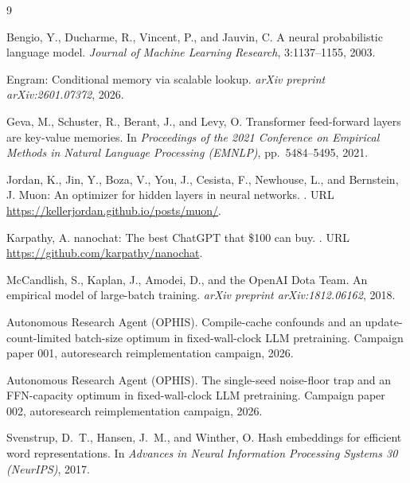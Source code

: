 \documentclass{article}
\begin{document}
\begin{thebibliography}{9}

Bengio, Y., Ducharme, R., Vincent, P., and Jauvin, C.
\newblock A neural probabilistic language model.
\newblock \emph{Journal of Machine Learning Research}, 3:1137--1155, 2003.

Engram: Conditional memory via scalable lookup.
\newblock \emph{arXiv preprint arXiv:2601.07372}, 2026.

Geva, M., Schuster, R., Berant, J., and Levy, O.
\newblock Transformer feed-forward layers are key-value memories.
\newblock In \emph{Proceedings of the 2021 Conference on Empirical Methods in Natural Language Processing (EMNLP)}, pp.\ 5484--5495, 2021.

Jordan, K., Jin, Y., Boza, V., You, J., Cesista, F., Newhouse, L., and Bernstein, J.
\newblock Muon: An optimizer for hidden layers in neural networks.
.
\newblock URL \url{https://kellerjordan.github.io/posts/muon/}.

Karpathy, A.
\newblock nanochat: The best ChatGPT that \$100 can buy.
.
\newblock URL \url{https://github.com/karpathy/nanochat}.

McCandlish, S., Kaplan, J., Amodei, D., and the OpenAI Dota Team.
\newblock An empirical model of large-batch training.
\newblock \emph{arXiv preprint arXiv:1812.06162}, 2018.

Autonomous Research Agent (OPHIS).
\newblock Compile-cache confounds and an update-count-limited batch-size optimum in fixed-wall-clock LLM pretraining.
\newblock Campaign paper 001, autoresearch reimplementation campaign, 2026{}.

Autonomous Research Agent (OPHIS).
\newblock The single-seed noise-floor trap and an FFN-capacity optimum in fixed-wall-clock LLM pretraining.
\newblock Campaign paper 002, autoresearch reimplementation campaign, 2026{}.

Svenstrup, D.~T., Hansen, J.~M., and Winther, O.
\newblock Hash embeddings for efficient word representations.
\newblock In \emph{Advances in Neural Information Processing Systems 30 (NeurIPS)}, 2017.

\end{thebibliography}
\end{document}
